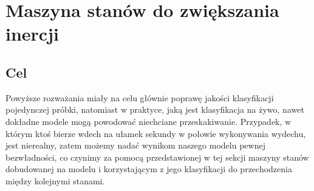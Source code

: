 \documentclass[polish]{article}
\begin{document}
\section{Maszyna stanów do zwiększania inercji}
\subsection{Cel}
Powyższe rozważania miały na celu głównie poprawę jakości klasyfikacji pojedynczej próbki, natomiast w praktyce, jaką jest klasyfikacja na żywo, nawet dokładne modele mogą powodować niechciane przeskakiwanie.
Przypadek, w którym ktoś bierze wdech na ułamek sekundy w połowie wykonywania wydechu, jest nierealny, zatem możemy nadać wynikom naszego modelu pewnej bezwładności, co czynimy za pomocą przedstawionej
w tej sekcji maszyny stanów dobudowanej na modelu i korzystającym z jego klasyfikacji do przechodzenia między kolejnymi stanami.
\end{document}
